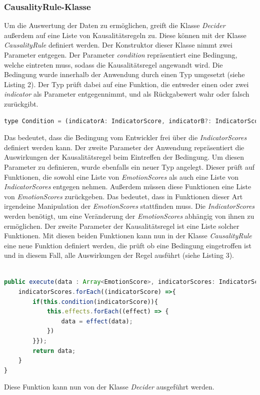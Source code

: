 \subsubsection{CausalityRule-Klasse}
Um die Auswertung der Daten zu ermöglichen, greift die Klasse \textit{Decider} außerdem auf eine Liste von Kausalitätsregeln zu. Diese können mit der Klasse \textit{CausalityRule} definiert werden.
Der Konstruktor dieser Klasse nimmt zwei Parameter entgegen. Der Parameter \textit{condition} repräsentiert eine Bedingung, welche eintreten muss, sodass die Kausalitätsregel angewandt wird. Die Bedingung wurde innerhalb der Anwendung durch einen Typ umgesetzt (siehe Listing 2). Der Typ prüft dabei auf eine Funktion, die entweder einen oder zwei \textit{indicator} als Parameter entgegennimmt, und als Rückgabewert wahr oder falsch zurückgibt.\newline \newline \newline
\begin{lstlisting}[caption={Typ condition}, language=JavaScript]
	type Condition = (indicatorA: IndicatorScore, indicatorB?: IndicatorScore) => boolean;
\end{lstlisting}
Das bedeutet, dass die Bedingung vom Entwickler frei über die \textit{IndicatorScores} definiert werden kann. Der zweite Parameter der Anwendung repräsentiert die Auswirkungen der Kausalitätsregel beim Eintreffen der Bedingung. Um diesen Parameter zu definieren, wurde ebenfalls ein neuer Typ angelegt. Dieser prüft auf Funktionen, die sowohl eine Liste von \textit{EmotionScores} als auch eine Liste von \textit{IndicatorScores} entgegen nehmen. Außerdem müssen diese Funktionen eine Liste von \textit{EmotionScores} zurückgeben. Das bedeutet, dass in Funktionen dieser Art irgendeine Manipulation der \textit{EmotionScores} stattfinden muss. Die \textit{IndicatorScores} werden benötigt, um eine Veränderung der \textit{EmotionScores} abhängig von ihnen zu ermöglichen. Der zweite Parameter der Kausalitätsregel ist eine Liste solcher Funktionen. Mit diesen beiden Funktionen kann nun in der Klasse \textit{CausalityRule} eine neue Funktion definiert werden, die prüft ob eine Bedingung eingetroffen ist und in diesem Fall, alle Auswirkungen der Regel ausführt (siehe Listing 3). \newline
\begin{lstlisting}[caption={execute Funktion der Klasse CausalityRule},language=JavaScript]

public execute(data : Array<EmotionScore>, indicatorScores: IndicatorScore[]) {
	indicatorScores.forEach((indicatorScore) =>{
		if(this.condition(indicatorScore)){
			this.effects.forEach((effect) => {
				data = effect(data);
			})
		}});
		return data;
	}
}

\end{lstlisting}
Diese Funktion kann nun von der Klasse \textit{Decider} ausgeführt werden. \newpage
